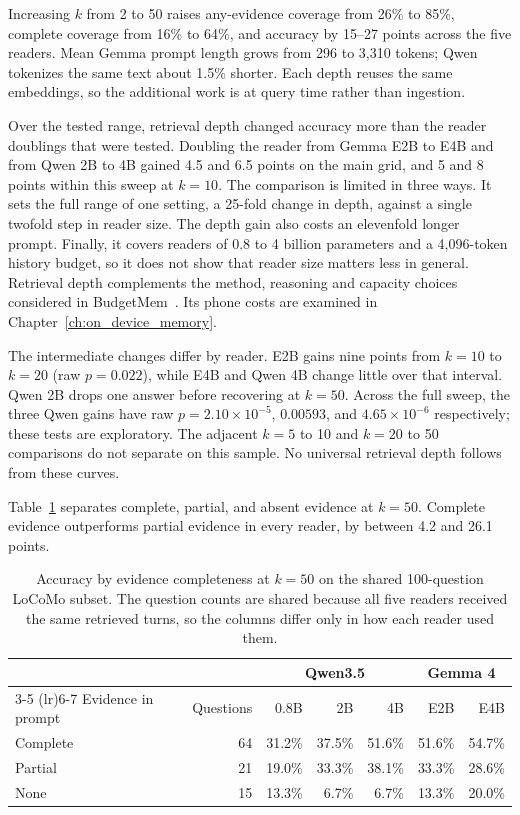 Increasing $k$ from 2 to 50 raises any-evidence coverage from 26\% to 85\%, complete
coverage from 16\% to 64\%, and accuracy by 15--27 points across the five readers.
Mean Gemma prompt length grows from 296 to 3,310 tokens; Qwen tokenizes the same text
about 1.5\% shorter. Each depth reuses the same embeddings, so the additional work is
at query time rather than ingestion.

Over the tested range, retrieval depth changed accuracy more than the reader doublings that
were tested. Doubling the reader from Gemma E2B to E4B and from Qwen 2B to 4B gained 4.5 and 6.5
points on the main grid, and 5 and 8 points within this sweep at $k=10$. The comparison is
limited in three ways. It sets the full range of one setting, a 25-fold change in depth, against
a single twofold step in reader size. The depth gain also costs an elevenfold longer prompt.
Finally, it covers readers of 0.8 to 4 billion parameters and a 4,096-token history budget, so
it does not show that reader size matters less in general. Retrieval depth complements the
method, reasoning and capacity choices considered in BudgetMem~\citep{budgetmem}. Its phone
costs are examined in Chapter~\ref{ch:on_device_memory}.

The intermediate changes differ by reader. E2B gains nine points from $k=10$ to $k=20$
(raw $p=0.022$), while E4B and Qwen 4B change little over that interval. Qwen 2B drops
one answer before recovering at $k=50$. Across the full sweep, the three Qwen gains have
raw $p=2.10\times10^{-5}$, $0.00593$, and $4.65\times10^{-6}$ respectively; these tests
are exploratory. The adjacent $k=5$ to 10 and $k=20$ to 50 comparisons do not separate
on this sample. No universal retrieval depth follows from these curves.

Table~\ref{tab:ch4_k50_completeness} separates complete, partial, and absent evidence at $k=50$.
Complete evidence outperforms partial evidence in every reader, by between 4.2 and 26.1 points.

\begin{table}[htbp]
  \centering
  \small
  \setlength{\tabcolsep}{6pt}
  \begin{tabular}{lrrrrrr}
    \toprule
    & & \multicolumn{3}{c}{Qwen3.5} & \multicolumn{2}{c}{Gemma 4} \\
    \cmidrule(lr){3-5} \cmidrule(lr){6-7}
    Evidence in prompt & Questions & 0.8B & 2B & 4B & E2B & E4B \\
    \midrule
    Complete & 64 & 31.2\% & 37.5\% & 51.6\% & 51.6\% & 54.7\% \\
    Partial  & 21 & 19.0\% & 33.3\% & 38.1\% & 33.3\% & 28.6\% \\
    None     & 15 & 13.3\% &  6.7\% &  6.7\% & 13.3\% & 20.0\% \\
    \bottomrule
  \end{tabular}
  \caption{Accuracy by evidence completeness at $k=50$ on the shared 100-question LoCoMo subset.
           The question counts are shared because all five readers received the same retrieved
           turns, so the columns differ only in how each reader used them.}
  \label{tab:ch4_k50_completeness}
\end{table}

